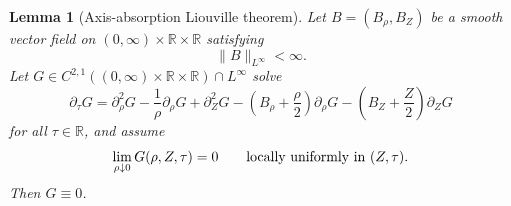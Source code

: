 \documentclass[11pt]{amsart}
\numberwithin{equation}{section}
\theoremstyle{plain}
\newtheorem{lemma}[theorem]{Lemma}
\theoremstyle{definition}
\theoremstyle{remark}
\begin{document}
\begin{lemma}[Axis-absorption Liouville theorem]
\label{lem:axis-absorption-liouville}
Let \(B=(B_\rho,B_Z)\) be a smooth vector field on
\((0,\infty)\times\mathbb R\times\mathbb R\) satisfying
\[
   \|B\|_{L^\infty}<\infty .
\]
Let \(G\in C^{2,1}((0,\infty)\times\mathbb R\times\mathbb R)\cap L^\infty\)
solve
\begin{equation}\label{eq:abstract-Gamma-equation}
   \partial_\tau G
   =
   \partial_\rho^2G-\frac1\rho\partial_\rho G+
      \partial_Z^2G
   -\left(B_\rho+\frac\rho2\right)\partial_\rho G
   -\left(B_Z+\frac Z2\right)\partial_ZG
\end{equation}
for all \(\tau\in\mathbb R\), and assume
\begin{equation}\label{eq:abstract-axis-zero}
   \lim_{\rho\downarrow0}G(\rho,Z,\tau)=0
   \qquad\hbox{locally uniformly in }(Z,\tau).
\end{equation}
Then \(G\equiv0\).
\end{lemma}
\end{document}
